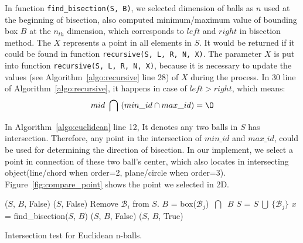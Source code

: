 In function \texttt{find\_bisection(S, B)}, we selected dimension of balls as
$n$ used at the beginning of bisection, also computed minimum/maximum value of
bounding box $B$ at the $n_{th}$ dimension, which corresponds to $left$ and $right$ in
bisection method. The $X$ represents a point in all elements in $S$. It would be
returned if it could be found in function \texttt{recursive(S, L, R, N, X)}. The parameter $X$ is put into function \texttt{recursive(S, L, R, N, X)}, because
it is necessary to update the values (see Algorithm~\ref{algo:recursive} line
28) of $X$ during the process. In 30 line of Algorithm~\ref{algo:recursive}, it
happens in case of $left > right$, which means:
\begin{equation*}
    mid \  \bigcap \  (min\_id \cap max\_id) = \O
\end{equation*}

In Algorithm~\ref{algo:euclidean} line 12, It denotes any two balls in $S$ has
intersection. Therefore, any point in the intersection of $min\_id$ and
$max\_id$, could be used for determining the direction of bisection. In our
implement, we select a point in connection of these two ball's center, which
also locates in intersecting object(line/chord when order=2, plane/circle when
order=3). Figure~\ref{fig:compare_point} shows the point we selected in 2D.



\begin{algorithm}
\begin{algorithmic}[1]
\Input
\EndInput
\Output
\EndOutput

 
    \State \Return ($S$, $B$, False)
\EndIf
{}
    \State \Return ($S$, False) 
\EndIf
{} 
    \State Remove $\mathcal{B}_i$ from $S$. %
\EndIf
\State $B$ = box($\mathcal{B}_j$) $\ \bigcap\ $ $B$
\State $S$ = $S \ \bigcup \  \{\mathcal{B}_j\}$
\State $x$ = find\_bisection($S$, $B$) 
    \State \Return ($S$, $B$, False)
\Else
    \State \Return ($S$, $B$, True)
\EndIf
\end{algorithmic}
\caption{Intersection test for Euclidean n-balls.}
\label{algo:euclidean}
\end{algorithm}


